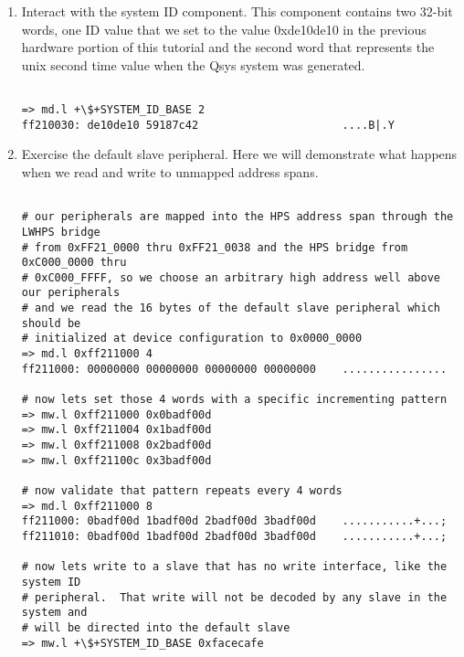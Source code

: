 \begin{flushleft}
\begin{enumerate}[
	label=\textbf{Step \arabic*.},
	leftmargin=*,
	widest={00},
	align=left]
\begin{enumerate}[
	label=\textbf{Step \arabic{enumi}\alph*.},
	leftmargin=*,
	align=left]
\begin{verbatim}
# next switch to the left moved down
=> md.l +\$+SWITCH_PIO_BASE 1
ff210020: 00000008                               ....

# last switch moved down
=> md.l +\$+SWITCH_PIO_BASE 1
ff210020: 00000000                               ....

\end{verbatim}

\item Interact with the system ID component.  This component contains two 32-bit words, one ID value that we set to the value 0xde10de10 in the previous hardware portion of this tutorial and the second word that represents the unix second time value when the Qsys system was generated.

\begin{verbatim}

=> md.l +\$+SYSTEM_ID_BASE 2
ff210030: de10de10 59187c42                      ....B|.Y

\end{verbatim}

\item Exercise the default slave peripheral.  Here we will demonstrate what happens when we read and write to unmapped address spans.

\begin{verbatim}

# our peripherals are mapped into the HPS address span through the LWHPS bridge
# from 0xFF21_0000 thru 0xFF21_0038 and the HPS bridge from 0xC000_0000 thru
# 0xC000_FFFF, so we choose an arbitrary high address well above our peripherals
# and we read the 16 bytes of the default slave peripheral which should be
# initialized at device configuration to 0x0000_0000
=> md.l 0xff211000 4
ff211000: 00000000 00000000 00000000 00000000    ................

# now lets set those 4 words with a specific incrementing pattern
=> mw.l 0xff211000 0x0badf00d
=> mw.l 0xff211004 0x1badf00d
=> mw.l 0xff211008 0x2badf00d
=> mw.l 0xff21100c 0x3badf00d

# now validate that pattern repeats every 4 words
=> md.l 0xff211000 8
ff211000: 0badf00d 1badf00d 2badf00d 3badf00d    ...........+...;
ff211010: 0badf00d 1badf00d 2badf00d 3badf00d    ...........+...;

# now lets write to a slave that has no write interface, like the system ID
# peripheral.  That write will not be decoded by any slave in the system and
# will be directed into the default slave
=> mw.l +\$+SYSTEM_ID_BASE 0xfacecafe


\end{verbatim}
\end{enumerate}
\end{enumerate}
\end{flushleft}
